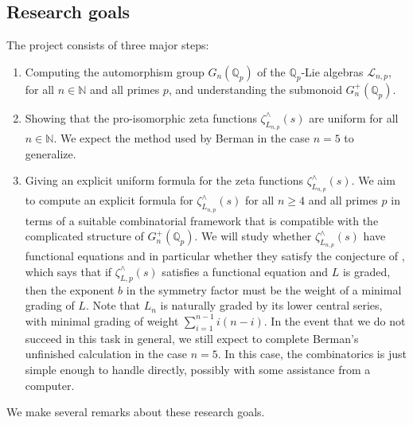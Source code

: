 \documentclass[12pt]{article}
\begin{document}
\subsection{Research goals}
The project consists of three major steps:
\begin{enumerate}
\item
Computing the automorphism group $G_{n}(\mathbb{Q}_{p})$ of the $\mathbb{Q}_p$-Lie algebras $\mathcal{L}_{n,p}$, for all $n\in\mathbb{N}$ and all primes $p$, and understanding the submonoid $G_{n}^{+}(\mathbb{Q}_{p})$.
\item
Showing that the pro-isomorphic zeta functions $\zeta_{L_{n,p}}^{\wedge}(s)$ are uniform for all $n\in\mathbb{N}$. We expect the method used by Berman in the case $n=5$ to generalize.
\item
Giving an explicit uniform formula for the zeta functions $\zeta_{L_{n,p}}^{\wedge}(s)$.
We aim to compute an explicit formula for $\zeta_{L_{n,p}}^{\wedge}(s)$ for all $n \geq 4$ and all primes $p$ in terms of a suitable combinatorial framework that is compatible with the complicated structure of $G_{n}^{+}(\mathbb{Q}_p)$. We will study whether $\zeta_{L_{n,p}}^{\wedge}(s)$ have functional equations and in particular whether they satisfy the conjecture of \cite[Conjecture 1.8]{BermanKlopschOnn}, which says that if $\zeta_{L,p}^{\wedge}(s)$ satisfies a functional equation and $L$ is graded, then the exponent $b$ in the symmetry factor must be the weight of a minimal grading of $L$. Note that $L_{n}$ is naturally graded by its lower central series, with minimal grading of weight $\sum_{i=1}^{n-1}{i(n-i)}$. In the event that we do not succeed in this task in general, we still expect to complete Berman's unfinished calculation in the case $n=5$. In this case, the combinatorics is just simple enough to handle directly, possibly with some assistance from a computer.
\end{enumerate}
We make several remarks about these research goals.
\end{document}
